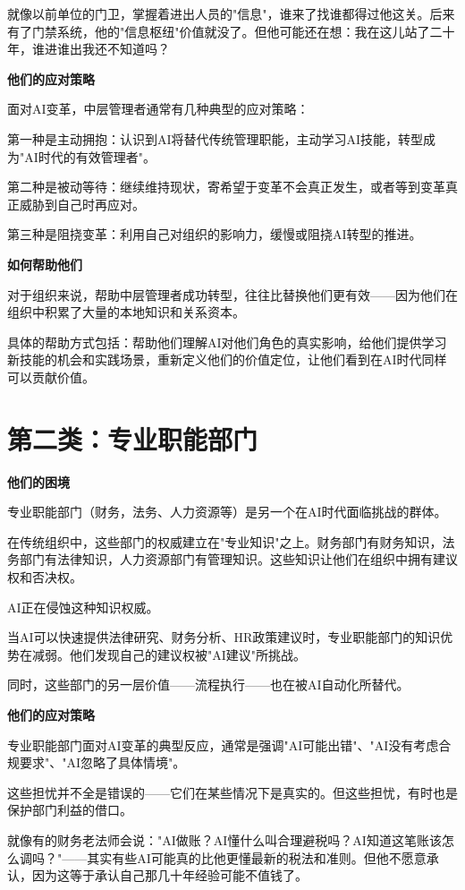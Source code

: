 就像以前单位的门卫，掌握着进出人员的"信息"，谁来了找谁都得过他这关。后来有了门禁系统，他的"信息枢纽"价值就没了。但他可能还在想：我在这儿站了二十年，谁进谁出我还不知道吗？

\textbf{他们的应对策略}

面对AI变革，中层管理者通常有几种典型的应对策略：

第一种是主动拥抱：认识到AI将替代传统管理职能，主动学习AI技能，转型成为"AI时代的有效管理者"。

第二种是被动等待：继续维持现状，寄希望于变革不会真正发生，或者等到变革真正威胁到自己时再应对。

第三种是阻挠变革：利用自己对组织的影响力，缓慢或阻挠AI转型的推进。

\textbf{如何帮助他们}

对于组织来说，帮助中层管理者成功转型，往往比替换他们更有效——因为他们在组织中积累了大量的本地知识和关系资本。

具体的帮助方式包括：帮助他们理解AI对他们角色的真实影响，给他们提供学习新技能的机会和实践场景，重新定义他们的价值定位，让他们看到在AI时代同样可以贡献价值。

\section{第二类：专业职能部门}


\textbf{他们的困境}

专业职能部门（财务，法务、人力资源等）是另一个在AI时代面临挑战的群体。

在传统组织中，这些部门的权威建立在"专业知识"之上。财务部门有财务知识，法务部门有法律知识，人力资源部门有管理知识。这些知识让他们在组织中拥有建议权和否决权。

AI正在侵蚀这种知识权威。

当AI可以快速提供法律研究、财务分析、HR政策建议时，专业职能部门的知识优势在减弱。他们发现自己的建议权被"AI建议"所挑战。

同时，这些部门的另一层价值——流程执行——也在被AI自动化所替代。

\textbf{他们的应对策略}

专业职能部门面对AI变革的典型反应，通常是强调"AI可能出错"、"AI没有考虑合规要求"、"AI忽略了具体情境"。

这些担忧并不全是错误的——它们在某些情况下是真实的。但这些担忧，有时也是保护部门利益的借口。

就像有的财务老法师会说："AI做账？AI懂什么叫合理避税吗？AI知道这笔账该怎么调吗？"——其实有些AI可能真的比他更懂最新的税法和准则。但他不愿意承认，因为这等于承认自己那几十年经验可能不值钱了。

